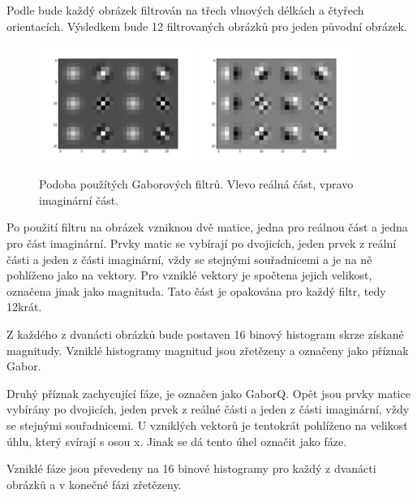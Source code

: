 \documentclass[czech,BP]{thesiskiv}
\begin{document}
\par Podle \citep{JEC} bude každý obrázek filtrován na třech vlnových délkách a čtyřech orientacích. Výsledkem bude 12 filtrovaných obrázků pro jeden původní obrázek. 


\begin{figure}[H]
	\centering
	\includegraphics[width=190px]{./img/gabor_filtry.png}
	\includegraphics[width=190px]{./img/gabor_filter_imag.png}	
	\caption{Podoba použítých Gaborových filtrů. Vlevo reálná část, vpravo imaginární část.}
\end{figure}

\par Po použití filtru na obrázek vzniknou dvě matice, jedna pro reálnou část a jedna pro část imaginární. Prvky matic se vybírají po dvojicích, jeden prvek z reální části a jeden z části imaginární, vždy se stejnými souřadnicemi a je na ně pohlíženo jako na vektory. Pro vzniklé vektory je spočtena jejich velikost, označena jinak jako magnituda. Tato část je opakována pro každý filtr, tedy 12krát.

\par Z každého z dvanácti obrázků bude postaven 16 binový histogram skrze získané magnitudy. Vzniklé histogramy magnitud jsou zřetězeny a označeny jako příznak Gabor. 

\par Druhý příznak zachycující fáze, je označen jako GaborQ. Opět jsou prvky matice vybírány po dvojicích, jeden prvek z reálné části a jeden z části imaginární, vždy se stejnými souřadnicemi. U vzniklých vektorů je tentokrát pohlíženo na velikost úhlu, který svírají s osou x. Jinak se dá tento úhel označit jako fáze.   
\par Vzniklé fáze jsou převedeny na 16 binové histogramy pro každý z dvanácti obrázků a v konečné fázi zřetězeny.
\end{document}
